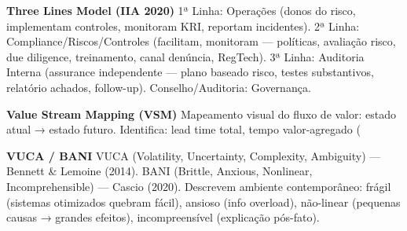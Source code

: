 \begin{ecglossario}
\item[\textbf{Three Lines Model (IIA 2020)}] 1ª Linha: Operações (donos do risco, implementam controles, monitoram KRI, reportam incidentes). 2ª Linha: Compliance/Riscos/Controles (facilitam, monitoram — políticas, avaliação risco, due diligence, treinamento, canal denúncia, RegTech). 3ª Linha: Auditoria Interna (assurance independente — plano baseado risco, testes substantivos, relatório achados, follow-up). Conselho/Auditoria: Governança.

\item[\textbf{Value Stream Mapping (VSM)}] Mapeamento visual do fluxo de valor: estado atual → estado futuro. Identifica: lead time total, tempo valor-agregado (%

\item[\textbf{VUCA / BANI}] VUCA (Volatility, Uncertainty, Complexity, Ambiguity) — Bennett \& Lemoine (2014). BANI (Brittle, Anxious, Nonlinear, Incomprehensible) — Cascio (2020). Descrevem ambiente contemporâneo: frágil (sistemas otimizados quebram fácil), ansioso (info overload), não-linear (pequenas causas → grandes efeitos), incompreensível (explicação pós-fato).

\end{ecglossario}
